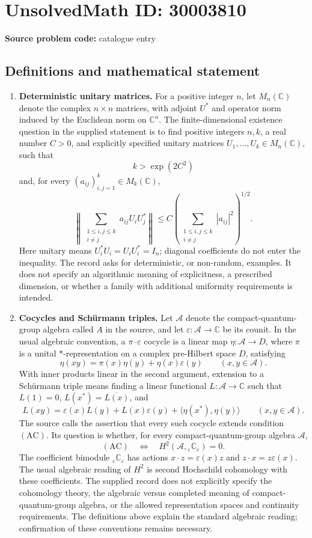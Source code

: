 \documentclass[11pt]{article}
\newcommand{\C}{\mathbb{C}}
\begin{document}
\section*{UnsolvedMath ID: 30003810}
\textbf{Source problem code:} catalogue entry
\subsection{Definitions and mathematical statement}
\begin{enumerate}
\item \textbf{Deterministic unitary matrices.} For a positive integer \(n\), let \(M_n(\C)\) denote the complex \(n\times n\) matrices, with adjoint \(U^*\) and operator norm induced by the Euclidean norm on \(\C^n\). The finite-dimensional existence question in the supplied statement is to find positive integers \(n,k\), a real number \(C>0\), and explicitly specified unitary matrices \(U_1,\ldots,U_k\in M_n(\C)\), such that
\[
 k>\exp(2C^2)
\]
and, for every \((a_{ij})_{i,j=1}^k\in M_k(\C)\),
\[
 \left\|\sum_{\substack{1\leq i,j\leq k\\i\ne j}}a_{ij}U_iU_j^*\right\|
 \leq C\left(\sum_{\substack{1\leq i,j\leq k\\i\ne j}}|a_{ij}|^2\right)^{1/2}.
\]
Here unitary means \(U_i^*U_i=U_iU_i^*=I_n\); diagonal coefficients do not enter the inequality. The record asks for deterministic, or non-random, examples. It does not specify an algorithmic meaning of explicitness, a prescribed dimension, or whether a family with additional uniformity requirements is intended.

\item \textbf{Cocycles and Sch\"urmann triples.} Let \(\mathcal A\) denote the compact-quantum-group algebra called \(A\) in the source, and let \(\varepsilon:\mathcal A\to\C\) be its counit. In the usual algebraic convention, a \(\pi\)--\(\varepsilon\) cocycle is a linear map \(\eta:\mathcal A\to D\), where \(\pi\) is a unital \(*\)-representation on a complex pre-Hilbert space \(D\), satisfying
\[
 \eta(xy)=\pi(x)\eta(y)+\eta(x)\varepsilon(y)
 \qquad(x,y\in\mathcal A).
\]
With inner products linear in the second argument, extension to a Sch\"urmann triple means finding a linear functional \(L:\mathcal A\to\C\) such that \(L(1)=0\), \(L(x^*)=\overline{L(x)}\), and
\[
 L(xy)=\varepsilon(x)L(y)+L(x)\varepsilon(y)
       +\langle\eta(x^*),\eta(y)\rangle
 \qquad(x,y\in\mathcal A).
\]
The source calls the assertion that every such cocycle extends condition \((\mathrm{AC})\). Its question is whether, for every compact-quantum-group algebra \(\mathcal A\),
\[
 (\mathrm{AC})\quad\Longleftrightarrow\quad
 H^2(\mathcal A,{}_{\varepsilon}\C_{\varepsilon})=0.
\]
The coefficient bimodule \({}_{\varepsilon}\C_{\varepsilon}\) has actions \(x\cdot z=\varepsilon(x)z\) and \(z\cdot x=z\varepsilon(x)\). The usual algebraic reading of \(H^2\) is second Hochschild cohomology with these coefficients. The supplied record does not explicitly specify the cohomology theory, the algebraic versus completed meaning of compact-quantum-group algebra, or the allowed representation spaces and continuity requirements. The definitions above explain the standard algebraic reading; confirmation of these conventions remains necessary.


\end{enumerate}
\end{document}
